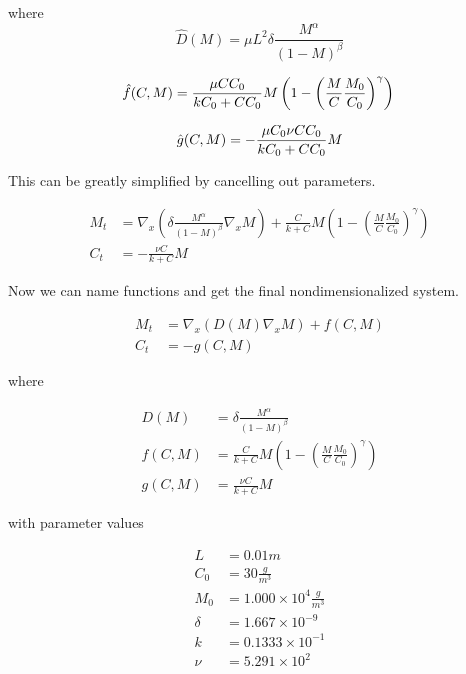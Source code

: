   where 
  \begin{equation}
    \hat{D}(M) = {\mu L^2 \delta} \frac{M^\alpha}{(1-M)^\beta}
  \end{equation}
  
  \begin{equation}
    \hat{f}({C},M) = \frac{{\mu} {C C_0}}{{k C_0} + {C C_0}} M \left(1 - \left( \frac{M}{{C}} \frac{M_0}{C_0} \right)^\gamma \right) \\
  \end{equation}
  
  \begin{equation}
    \hat{g}({C},M) = -\frac{{\mu C_0 \nu} {C C_0}}{{k C_0} + {C C_0}} M \\
  \end{equation}
  
  This can be greatly simplified by cancelling out parameters.
  
  \begin{align}
    M_t &= \nabla_x \left( {\delta} \frac{M^\alpha}{(1-M)^\beta} \nabla_x M\right) + \frac{ C }{{k } + {C}} M \left(1 - \left( \frac{M}{{C}} \frac{M_0}{C_0} \right)^\gamma \right) \\
    C_t &= - \frac{\nu C}{k + C} M
  \end{align}
  
  Now we can name functions and get the final nondimensionalized system.
  
  \begin{align} \label{equ:model_system}
    M_t &= \nabla_x \left( D(M) \nabla_x M \right) + f(C,M) \\
    C_t &= - g(C,M) 
  \end{align}
  
  where
  
  \begin{equation}
  \begin{aligned} \label{equ:model_functions}
    D(M) &= \delta \frac{M^\alpha}{(1 - M)^\beta} \\
    f(C,M) &= \frac{ C }{{k } + {C}} M \left(1 - \left( \frac{M}{{C}} \frac{M_0}{C_0} \right)^\gamma \right) \\
    g(C,M) &= \frac{\nu C}{k +C} M
  \end{aligned}
  \end{equation}
  
  with parameter values
  
  \begin{equation}
    \begin{aligned}
      L &= 0.01 m \\
      C_0 &= 30 \frac{g}{m^3} \\
      M_0 &= 1.000 \times 10^{4}\frac{g}{m^3} \\
      \delta &= 1.667 \times 10^{-9}\\
      k &= 0.1333 \times 10^{-1}\\
      \nu &= 5.291 \times 10^{2}\\
    \end{aligned}
  \end{equation}


